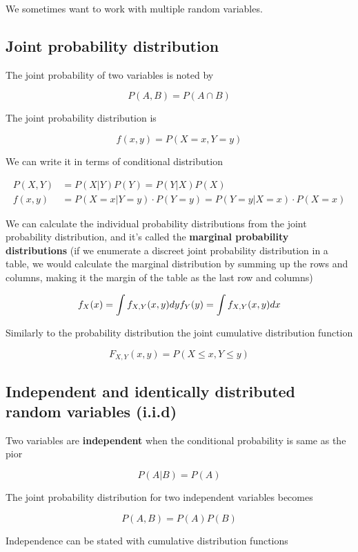 We sometimes want to work with multiple random variables.

\subsection{Joint probability distribution}

The joint probability of two variables is noted by

\[P(A, B) = P(A \cap B)\]

The joint probability distribution is

\[f(x, y) = P(X = x, Y= y)\]

We can write it in terms of conditional distribution

\[\begin{aligned}P(X,Y) &= P(X|Y)P(Y) = P(Y|X)P(X)\\
f(x, y) &= P(X = x | Y= y) \cdot P(Y= y) = P(Y = y | X = x) \cdot P(X = x)\end{aligned}\]

We can calculate the individual probability distributions from the joint probability distribution, and it's called the \textbf{marginal probability distributions} (if we enumerate a discreet joint probability distribution in a table, we would calculate the marginal distribution by summing up the rows and columns, making it the margin of the table as the last row and columns)

\[f_X(x) = \int f_{X,Y}(x,y)dy \\ f_Y(y) = \int f_{X,Y}(x,y)dx\]

Similarly to the probability distribution the joint cumulative distribution function

\[F_{X,Y}(x,y) = P(X \le x, Y \le y)\]

\subsection{Independent and identically distributed random variables (i.i.d)}

Two variables are \textbf{independent} when the conditional probability is same as the pior

\[P(A|B) = P(A)\]

The joint probability distribution for two independent variables becomes

\[P(A,B) = P(A)P(B)\]

Independence can be stated with cumulative distribution functions

